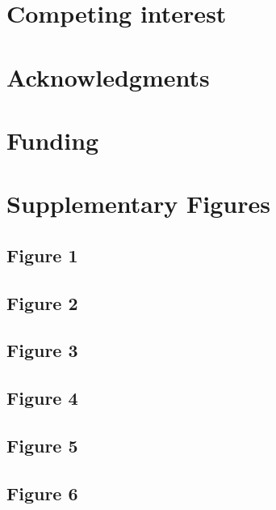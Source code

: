 \documentclass[12pt,twoside]{reedthesis}
\begin{document}
\hypertarget{competing-interest}{%
\section{Competing interest}\label{competing-interest}}

\newpage

\hypertarget{acknowledgments}{%
\section{Acknowledgments}\label{acknowledgments}}

\hypertarget{funding}{%
\section{Funding}\label{funding}}

\newpage

\hypertarget{supplementary-figures}{%
\section{Supplementary Figures}\label{supplementary-figures}}

\hypertarget{figure-1}{%
\subsection{Figure 1}\label{figure-1}}

\hypertarget{figure-2}{%
\subsection{Figure 2}\label{figure-2}}

\hypertarget{figure-3}{%
\subsection{Figure 3}\label{figure-3}}

\hypertarget{figure-4}{%
\subsection{Figure 4}\label{figure-4}}

\hypertarget{figure-5}{%
\subsection{Figure 5}\label{figure-5}}

\hypertarget{figure-6}{%
\subsection{Figure 6}\label{figure-6}}
\end{document}
